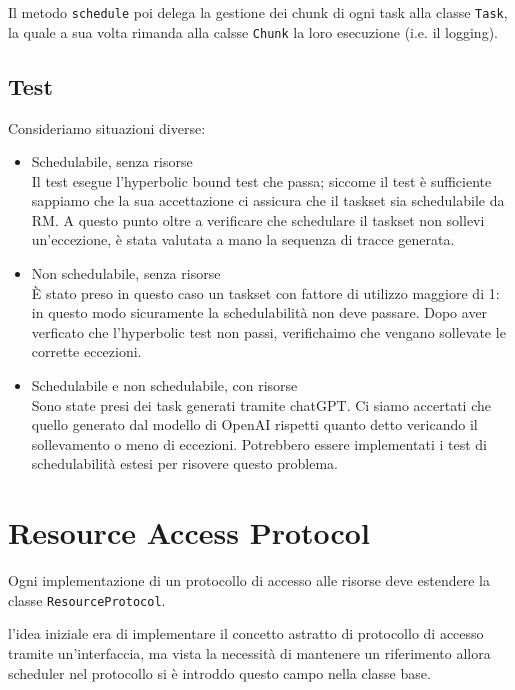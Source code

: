 \myskip

Il metodo \texttt{schedule} poi delega la gestione dei chunk di ogni task alla classe \texttt{Task}, la quale a sua volta rimanda alla calsse \texttt{Chunk} la loro esecuzione (i.e. il logging).

\subsection{Test}
Consideriamo situazioni diverse:
\begin{itemize}
    \item Schedulabile, senza risorse \\
        Il test esegue l'hyperbolic bound test che passa; siccome il test è sufficiente sappiamo che la sua accettazione ci assicura che il taskset sia schedulabile da RM. A questo punto oltre a verificare che schedulare il taskset non sollevi un'eccezione, è stata valutata a mano la sequenza di tracce generata.
    \item Non schedulabile, senza risorse \\
        È stato preso in questo caso un taskset con fattore di utilizzo maggiore di 1: in questo modo sicuramente la schedulabilità non deve passare. Dopo aver verficato che l'hyperbolic test non passi, verifichaimo che vengano sollevate le corrette eccezioni.
    \item Schedulabile e non schedulabile, con risorse \\
        Sono state presi dei task generati tramite chatGPT. Ci siamo accertati che quello generato dal modello di OpenAI rispetti quanto detto vericando il sollevamento o meno di eccezioni. Potrebbero essere implementati i test di schedulabilità estesi per risovere questo problema.
\end{itemize}


\section{Resource Access Protocol}
Ogni implementazione di un protocollo di accesso alle risorse deve estendere la classe \texttt{ResourceProtocol}.

l'idea iniziale era di implementare il concetto astratto di protocollo di accesso tramite un'interfaccia, ma vista la necessità di mantenere un riferimento allora scheduler nel protocollo si è introddo questo campo nella classe base.

\myskip

